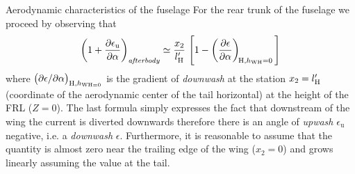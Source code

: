 \documentclass[[12pt,twoside]{book}
\begin{document}
\begin{myExampleX}{Aerodynamic characteristics of the fuselage}{}
For the rear trunk of the fuselage we proceed by observing that
\[
\left( 1 + \frac{\partial\epsilon_\mathrm{u}}{\partial\alpha} \right)_\text{\emph{afterbody}}
\simeq
\frac{x_2}{l'_{\mathrm{H}}}\,\left[ 1 - \left(\frac{\partial\epsilon}{\partial\alpha}\right)_{\!\mathrm{H},h_\mathrm{WH}=0} \, \right]
\]
where $\big(\partial\epsilon/\partial\alpha\big)_{\mathrm{H},h_\mathrm{WH=0}}$ is the gradient of \emph{downwash}
at the station $x_2=l'_{\mathrm{H}}$ (coordinate of the aerodynamic center of the tail
horizontal) at the height of the FRL ($Z=0$).
The last formula simply expresses the fact that downstream of the wing the current is diverted downwards
therefore there is an angle of \emph{upwash} $\epsilon_\mathrm{u}$ negative, i.e. a \emph{downwash}
$\epsilon$. Furthermore, it is reasonable to assume that the quantity
is almost zero near the trailing edge of the wing ($x_2=0$) and grows
linearly assuming the value 
at the tail.


\end{myExampleX}
\end{document}
